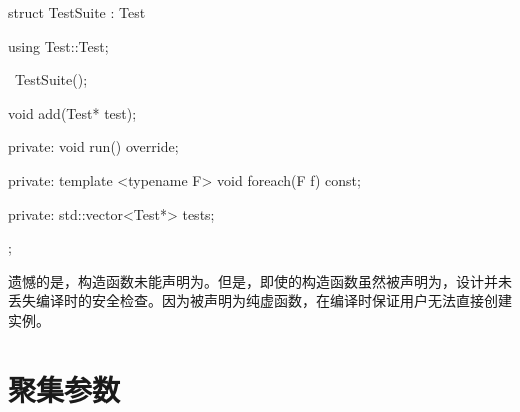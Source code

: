 \begin{content}
\begin{leftbar}
\begin{c++}[caption={\ttfamily{include/mars/core/TestSuite.h}}]
struct TestSuite : Test {
  using Test::Test;

  ~TestSuite();

  void add(Test* test);

private:
  void run() override;

private:
  template <typename F>
  void foreach(F f) const;

private:
  std::vector<Test*> tests;
};
 \end{c++}
\end{leftbar}

遗憾的是，构造函数未能声明为。但是，即使的构造函数虽然被声明为，设计并未丢失编译时的安全检查。因为被声明为纯虚函数，在编译时保证用户无法直接创建实例。

\end{content}

\section{聚集参数}

